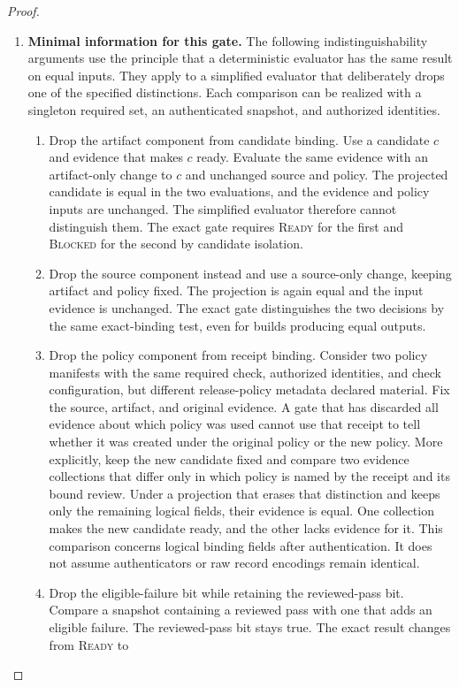 \begin{proof}
\begin{enumerate}
\item \textbf{Minimal information for this gate.}
The following indistinguishability arguments use the
principle that a deterministic evaluator has the same
result on equal inputs.
They apply to a simplified evaluator that deliberately drops
one of the specified distinctions.
Each comparison can be realized with a singleton required
set, an authenticated snapshot, and authorized identities.
\begin{enumerate}
\item Drop the artifact component from candidate binding.
Use a candidate $c$ and evidence that makes $c$ ready.
Evaluate the same evidence with an artifact-only change
to $c$ and unchanged source and policy.
The projected candidate is equal in the two evaluations,
and the evidence and policy inputs are unchanged.
The simplified evaluator therefore cannot distinguish them.
The exact gate requires \textsc{Ready} for the first and
\textsc{Blocked} for the second by candidate isolation.
\item Drop the source component instead and use a source-only
change, keeping artifact and policy fixed.
The projection is again equal and the input evidence is
unchanged.
The exact gate distinguishes the two decisions by the same
exact-binding test, even for builds producing equal outputs.
\item Drop the policy component from receipt binding.
Consider two policy manifests with the same required check,
authorized identities, and check configuration, but different
release-policy metadata declared material.
Fix the source, artifact, and original evidence.
A gate that has discarded all evidence about which policy
was used cannot use that receipt to tell whether it was
created under the original policy or the new policy.
More explicitly, keep the new candidate fixed and compare
two evidence collections that differ only in which policy is
named by the receipt and its bound review.
Under a projection that erases that distinction and keeps
only the remaining logical fields, their evidence is equal.
One collection makes the new candidate ready, and the
other lacks evidence for it.
This comparison concerns logical binding fields after
authentication. It does not assume authenticators or raw
record encodings remain identical.
\item Drop the eligible-failure bit while retaining the
reviewed-pass bit.
Compare a snapshot containing a reviewed pass with one
that adds an eligible failure.
The reviewed-pass bit stays true.
The exact result changes from \textsc{Ready} to

\end{enumerate}
\end{enumerate}
\end{proof}
